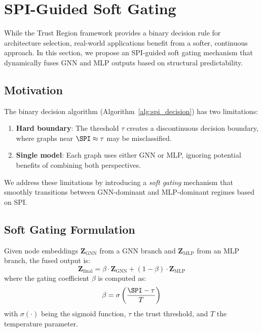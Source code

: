
\section{SPI-Guided Soft Gating}
\label{sec:spi_fusion}

While the Trust Region framework provides a binary decision rule for architecture selection, real-world applications benefit from a softer, continuous approach. In this section, we propose an SPI-guided soft gating mechanism that dynamically fuses GNN and MLP outputs based on structural predictability.

\subsection{Motivation}

The binary decision algorithm (Algorithm~\ref{alg:spi_decision}) has two limitations:
\begin{enumerate}
    \item \textbf{Hard boundary}: The threshold $\tau$ creates a discontinuous decision boundary, where graphs near $\SPI \approx \tau$ may be misclassified.
    \item \textbf{Single model}: Each graph uses either GNN or MLP, ignoring potential benefits of combining both perspectives.
\end{enumerate}

We address these limitations by introducing a \textit{soft gating} mechanism that smoothly transitions between GNN-dominant and MLP-dominant regimes based on SPI.

\subsection{Soft Gating Formulation}

\begin{definition}
Given node embeddings $\mathbf{Z}_{\text{GNN}}$ from a GNN branch and $\mathbf{Z}_{\text{MLP}}$ from an MLP branch, the fused output is:
\begin{equation}
    \mathbf{Z}_{\text{final}} = \beta \cdot \mathbf{Z}_{\text{GNN}} + (1 - \beta) \cdot \mathbf{Z}_{\text{MLP}}
\end{equation}
where the gating coefficient $\beta$ is computed as:
\begin{equation}
    \beta = \sigma\left(\frac{\SPI - \tau}{T}\right)
\end{equation}
with $\sigma(\cdot)$ being the sigmoid function, $\tau$ the trust threshold, and $T$ the temperature parameter.
\end{definition}

